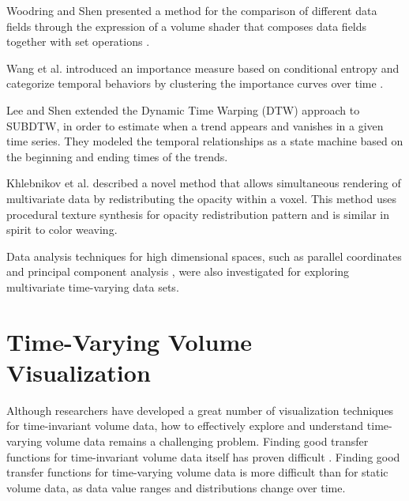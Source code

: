Woodring and Shen presented a method for the comparison of different data fields through the expression of a volume shader that composes data fields together with set operations \cite{woodring_multi-variate_2006}.

Wang et al. introduced an importance measure based on conditional entropy and categorize temporal behaviors by clustering the importance curves over time \cite{wang_importance-driven_2008}.

Lee and Shen \cite{lee_visualization_2009} extended the Dynamic Time Warping (DTW) approach \cite{lee_visualizing_2009} to SUBDTW, in order to estimate when a trend appears and vanishes in a given time series. They modeled the temporal relationships as a state machine based on the beginning and ending times of the trends.

Khlebnikov et al. \cite{khlebnikov_noise-based_2013} described a novel method that allows simultaneous rendering of multivariate data by redistributing the opacity within a voxel. This method uses procedural texture synthesis \cite{khlebnikov_procedural_2012} for opacity redistribution pattern and is similar in spirit to color weaving.

Data analysis techniques for high dimensional spaces, such as parallel coordinates \cite{akiba_visualizing_2007} \cite{guo_scalable_2012} and principal component analysis \cite{liu_multivariate_2014}, were also investigated for exploring multivariate time-varying data sets.


\section{Time-Varying Volume Visualization}
Although researchers have developed a great number of visualization techniques for time-invariant volume data, how to effectively explore and understand time-varying volume data remains a challenging problem. Finding good transfer functions for time-invariant volume data itself has proven difficult \cite{pfister_transfer_2001}.
Finding good transfer functions for time-varying volume data is more difficult than for static volume data, as data value ranges and distributions change over time.


